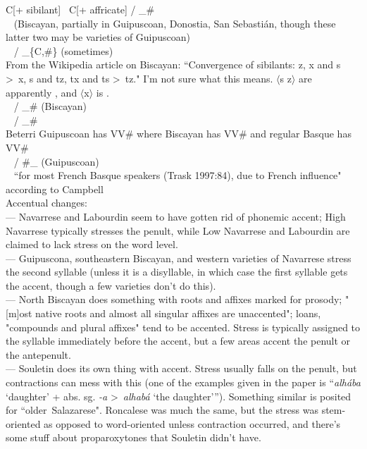 \documentclass[11pt]{article}
\newcommand{\ipa}{\textipa}
\newcommand{\change}{\textrightarrow}
\begin{document}
C[+ sibilant] \change\ C[+ affricate] / _\#\\
\ipa{\textsubsquare{s} t\|]s} \change\ \ipa{\|]s t\textsubsquare{s}} (Biscayan, partially in Guipuscoan, Donostia, San Sebasti\'{a}n, though these latter two may be varieties of Guipuscoan)\\
\ipa{\textsubsquare{s}} \change\ \ipa{\|]s} / _\{C,\#\} (sometimes)\\
From the Wikipedia article on Biscayan: ``Convergence of sibilants: z, x and s \textgreater\ x, s and tz, tx and ts \textgreater\ tz." I'm not sure what this means. $\langle$s z$\rangle$ are apparently \ipa{\textsubsquare{s} \|]s}, and $\langle$x$\rangle$ is \ipa{S}.\\
\ipa{it\|]s} \change\ \ipa{tS} / _\# (Biscayan)\\
\ipa{oa ea} \change\ \ipa{u(e) i(e)} / _\#\\
Beterri Guipuscoan has V\ipa{j}V\# where Biscayan has V\ipa{\textltailn}V\# and regular Basque has VV\#\\
\ipa{\|]s} \change\ \ipa{tS} / \#_ (Guipuscoan)\\
\ipa{\|]s} \change\ \ipa{\|]S} ``for most French Basque speakers (Trask 1997:84), due to French influence" according to Campbell\\
Accentual changes:\\
--- Navarrese and Labourdin seem to have gotten rid of phonemic accent; High Navarrese typically stresses the penult, while Low Navarrese and Labourdin are claimed to lack stress on the word level.\\
--- Guipuscona, southeastern Biscayan, and western varieties of Navarrese stress the second syllable (unless it is a disyllable, in which case the first syllable gets the accent, though a few varieties don't do this).\\
--- North Biscayan does something with roots and affixes marked for prosody; "[m]ost native roots and almost all singular affixes are unaccented"; loans, "compounds and plural affixes" tend to be accented. Stress is typically assigned to the syllable immediately before the accent, but a few areas accent the penult or the antepenult.\\
--- Souletin does its own thing with accent. Stress usually falls on the penult, but contractions can mess with this (one of the examples given in the paper is ``{\it alh\'{a}ba} `daughter' + abs. sg. {\it -a} \textgreater\ {\it alhab\'{a}} `the daughter'''). Something similar is posited for ``older\textellipsis\ Salazarese". Roncalese was much the same, but the stress was stem-oriented as opposed to word-oriented unless contraction occurred, and there's some stuff about proparoxytones that Souletin didn't have.
\end{document}
